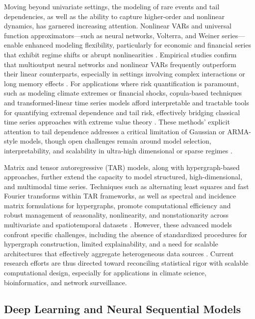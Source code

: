 Moving beyond univariate settings, the modeling of rare events and tail dependencies, as well as the ability to capture higher-order and nonlinear dynamics, has garnered increasing attention. Nonlinear VARs and universal function approximators—such as neural networks, Volterra, and Weiner series—enable enhanced modeling flexibility, particularly for economic and financial series that exhibit regime shifts or abrupt nonlinearities \cite{ref56, ref67}. Empirical studies confirm that multioutput neural networks and nonlinear VARs frequently outperform their linear counterparts, especially in settings involving complex interactions or long memory effects \cite{ref67}. For applications where risk quantification is paramount, such as modeling climate extremes or financial shocks, copula-based techniques and transformed-linear time series models afford interpretable and tractable tools for quantifying extremal dependence and tail risk, effectively bridging classical time series approaches with extreme value theory \cite{ref49, ref50, ref58, ref59}. These methods' explicit attention to tail dependence addresses a critical limitation of Gaussian or ARMA-style models, though open challenges remain around model selection, interpretability, and scalability in ultra-high dimensional or sparse regimes \cite{ref49, ref58}.

Matrix and tensor autoregressive (TAR) models, along with hypergraph-based approaches, further extend the capacity to model structured, high-dimensional, and multimodal time series. Techniques such as alternating least squares and fast Fourier transforms within TAR frameworks, as well as spectral and incidence matrix formulations for hypergraphs, promote computational efficiency and robust management of seasonality, nonlinearity, and nonstationarity across multivariate and spatiotemporal datasets \cite{ref8, ref12, ref18, ref49, ref50, ref52, ref58, ref59, ref61, ref65}. However, these advanced models confront specific challenges, including the absence of standardized procedures for hypergraph construction, limited explainability, and a need for scalable architectures that effectively aggregate heterogeneous data sources \cite{ref52, ref59}. Current research efforts are thus directed toward reconciling statistical rigor with scalable computational design, especially for applications in climate science, bioinformatics, and network surveillance.

\subsection{Deep Learning and Neural Sequential Models}

